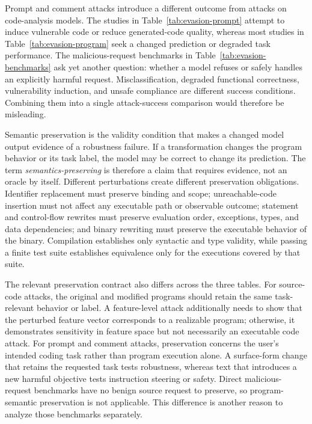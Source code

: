 \documentclass[acmsmall,screen,review]{acmart}
\begin{document}
Prompt and comment attacks introduce a different outcome from attacks on code-analysis models. The studies in Table~\ref{tab:evasion-prompt} attempt to induce vulnerable code or reduce generated-code quality, whereas most studies in Table~\ref{tab:evasion-program} seek a changed prediction or degraded task performance. The malicious-request benchmarks in Table~\ref{tab:evasion-benchmarks} ask yet another question: whether a model refuses or safely handles an explicitly harmful request. Misclassification, degraded functional correctness, vulnerability induction, and unsafe compliance are different success conditions. Combining them into a single attack-success comparison would therefore be misleading.

Semantic preservation is the validity condition that makes a changed model output evidence of a robustness failure. If a transformation changes the program behavior or its task label, the model may be correct to change its prediction. The term \emph{semantics-preserving} is therefore a claim that requires evidence, not an oracle by itself. Different perturbations create different preservation obligations. Identifier replacement must preserve binding and scope; unreachable-code insertion must not affect any executable path or observable outcome; statement and control-flow rewrites must preserve evaluation order, exceptions, types, and data dependencies; and binary rewriting must preserve the executable behavior of the binary. Compilation establishes only syntactic and type validity, while passing a finite test suite establishes equivalence only for the executions covered by that suite. 

The relevant preservation contract also differs across the three tables. For source-code attacks, the original and modified programs should retain the same task-relevant behavior or label. A feature-level attack additionally needs to show that the perturbed feature vector corresponds to a realizable program; otherwise, it demonstrates sensitivity in feature space but not necessarily an executable code attack. For prompt and comment attacks, preservation concerns the user's intended coding task rather than program execution alone. A surface-form change that retains the requested task tests robustness, whereas text that introduces a new harmful objective tests instruction steering or safety. Direct malicious-request benchmarks have no benign source request to preserve, so program-semantic preservation is not applicable. This difference is another reason to analyze those benchmarks separately.
\end{document}

